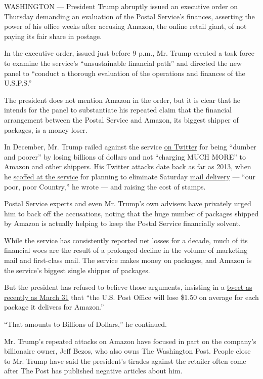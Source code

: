 WASHINGTON --- President Trump abruptly issued an executive order on
Thursday demanding an evaluation of the Postal Service's finances,
asserting the power of his office weeks after accusing Amazon, the
online retail giant, of not paying its fair share in postage.

In the executive order, issued just before 9 p.m., Mr. Trump created a
task force to examine the service's ``unsustainable financial path'' and
directed the new panel to ``conduct a thorough evaluation of the
operations and finances of the U.S.P.S.''

The president does not mention Amazon in the order, but it is clear that
he intends for the panel to substantiate his repeated claim that the
financial arrangement between the Postal Service and Amazon, its biggest
shipper of packages, is a money loser.

In December, Mr. Trump railed against the service
\href{https://twitter.com/realdonaldtrump/status/946728546633953285}{on
Twitter} for being ``dumber and poorer'' by losing billions of dollars
and not ``charging MUCH MORE'' to Amazon and other shippers. His Twitter
attacks date back as far as 2013, when he
\href{https://twitter.com/realdonaldtrump/status/299212012121112578}{scoffed
at the service} for planning to eliminate Saturday
\href{https://about.usps.com/news/national-releases/2013/pr13_019.htm}{mail
delivery} --- ``our poor, poor Country,'' he wrote --- and raising the
cost of stamps.

Postal Service experts and even Mr. Trump's own advisers have privately
urged him to back off the accusations, noting that the huge number of
packages shipped by Amazon is actually helping to keep the Postal
Service financially solvent.

While the service has consistently reported net losses for a decade,
much of its financial woes are the result of a prolonged decline in the
volume of marketing mail and first-class mail. The service makes money
on packages, and Amazon is the service's biggest single shipper of
packages.

But the president has refused to believe those arguments, insisting in a
\href{https://twitter.com/realDonaldTrump/status/980063581592047617}{tweet
as recently as March 31} that ``the U.S. Post Office will lose \$1.50 on
average for each package it delivers for Amazon.''

``That amounts to Billions of Dollars,'' he continued.

Mr. Trump's repeated attacks on Amazon have focused in part on the
company's billionaire owner, Jeff Bezos, who also owns The Washington
Post. People close to Mr. Trump have said the president's tirades
against the retailer often come after The Post has published negative
articles about him.


